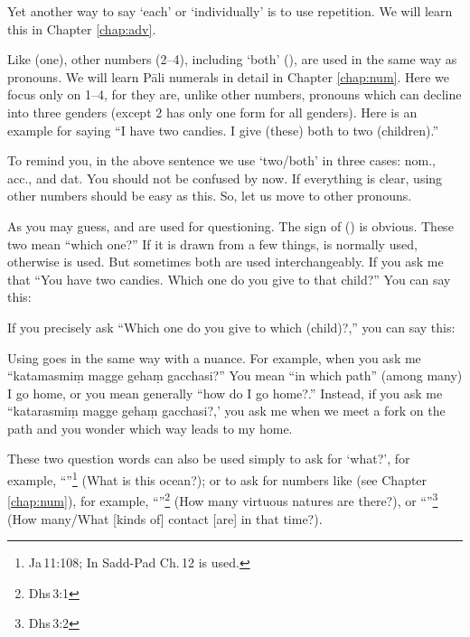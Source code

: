 Yet another way to say `each' or `individually' is to use repetition. We will learn this in Chapter \ref{chap:adv}.

Like  (one), other numbers (2--4), including `both' (), are used in the same way as pronouns. We will learn P\=ali numerals in detail in Chapter \ref{chap:num}. Here we focus only on 1--4, for they are, unlike other numbers, pronouns which can decline into three genders (except 2 has only one form for all genders). Here is an example for saying ``I have two candies. I give (these) both to two (children).''


To remind you, in the above sentence we use `two/both' in three cases: nom., acc., and dat. You should not be confused by now. If everything is clear, using other numbers should be easy as this. So, let us move to other pronouns.

As you may guess,  and  are used for questioning. The sign of  () is obvious. These two mean ``which one?'' If it is drawn from a few things,  is normally used, otherwise  is used. But sometimes both are used interchangeably. If you ask me that ``You have two candies. Which one do you give to that child?'' You can say this:


If you precisely ask ``Which one do you give to which (child)?,'' you can say this:


Using  goes in the same way with a nuance. For example, when you ask me ``katamasmi\d m magge geha\d m gacchasi?'' You mean ``in which path'' (among many) I go home, or you mean generally ``how do I go home?.'' Instead, if you ask me ``katarasmi\d m magge geha\d m gacchasi?,' you ask me when we meet a fork on the path and you wonder which way leads to my home.

These two question words can also be used simply to ask for `what?', for example, ``''\footnote{Ja\,11:108; In Sadd-Pad Ch.\,12  is used.} (What is this ocean?); or to ask for numbers like  (see Chapter \ref{chap:num}), for example, ``''\footnote{Dhs\,3:1} (How many virtuous natures are there?), or ``''\footnote{Dhs\,3:2} (How many/What [kinds of] contact [are] in that time?).

